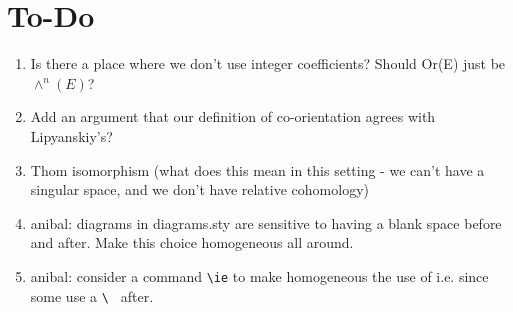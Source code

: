 
\section*{To-Do}
\begin{enumerate}
	\item Is there a place where we don't use integer coefficients?  Should Or(E) just be $\wedge^n(E)$?

	\item Add an argument that our definition of co-orientation agrees with Lipyanskiy's?

	\item Thom isomorphism (what does this mean in this setting - we can't have a singular space, and we don't have relative cohomology)




	\item anibal: diagrams in diagrams.sty are sensitive to having a blank space before and after.
	Make this choice homogeneous all around.

	\item anibal: consider a command \verb|\ie| to make homogeneous the use of i.e. since some use a \verb|\ | after.
\begin{comment}
	\item \sout{Picture for creasing.}
	\item Compactness and orientation assumptions on Theorem 3.13 (transversality constrains preserve q-iso type).

	\item \sout{Treatment of creasing.}
	\item Guillemin-Pollock for mnfds with corner.

	\item Clarify isomorphisms used in orientations and make more explicit how the Lipyanskiy orientations fit.


	\item More on Mayer-Vietoris - check full argument
	\item Poincar\'e Lemma - check new proof
	\item (Anibal) Add a better treatment of ``cst" from \verb|Flows/old/pd_cubical_S2.Feb16.tex| \\
	Greg: Let K be any finite set of cubical faces and let L be a single cubical face. We need $cst(K)\cup cst(L)$ to be $cst(K\cup L)$  (maybe this part is just by definition?) and we need $cst(K)\cap cst(L)$ to be $cst(K ? L)$   where $K ? L$ needs to be some set of faces with cardinality less than or equal to that of K.
\end{comment}


\end{enumerate}
